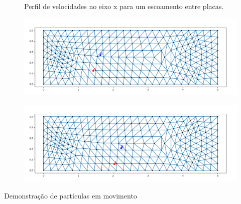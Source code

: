 \documentclass{beamer}
\begin{document}
\begin{frame}
  \begin{figure}
     {\raggedleft \tiny Perfil de velocidades no eixo x para um escoamento entre placas.}
  \end{figure}
  
  \begin{minipage}{.49\textwidth}
    \begin{figure}
      \includegraphics[width=\linewidth]{figure/particles_results_2.png}
    \end{figure}
  \end{minipage}
  \begin{minipage}{.49\textwidth}
    \begin{figure}
      \includegraphics[width=\linewidth]{figure/particles_results_3.png}
    \end{figure}
  \end{minipage}
  
  \tiny{Demonstração de partículas em movimento}
\end{frame}

\end{document}
